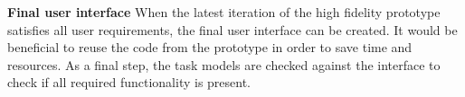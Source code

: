         \noindent\textbf{Final user interface} When the latest iteration of the high fidelity prototype satisfies all user requirements, the final user interface can be created. It would be beneficial to reuse the code from the prototype in order to save time and resources. As a final step, the task models are checked against the interface to check if all required functionality is present.\\


        

        


